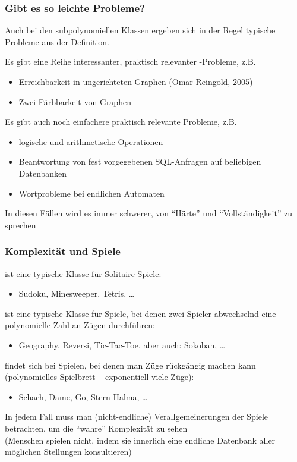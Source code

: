 \documentclass[onlymath]{beamer}
\begin{document}
\begin{frame}\frametitle{Gibt es so leichte Probleme?}

Auch bei den subpolynomiellen Klassen ergeben sich in der Regel typische Probleme
aus der Definition.
\bigskip\pause

Es gibt eine Reihe \alert{interessanter, praktisch relevanter \LogSpace-Probleme}, z.B.
\begin{itemize}
\item Erreichbarkeit in ungerichteten Graphen (Omar Reingold, 2005)
\item Zwei-Färbbarkeit von Graphen
\end{itemize}
\bigskip\pause

Es gibt auch \alert{noch einfachere praktisch relevante Probleme}, z.B.
\begin{itemize}
\item logische und arithmetische Operationen
\item Beantwortung von fest vorgegebenen SQL-Anfragen auf beliebigen Datenbanken
\item Wortprobleme bei endlichen Automaten
\end{itemize}

In diesen Fällen wird es immer schwerer, von "`Härte"' und "`Vollständigkeit"' zu sprechen

\end{frame}

\begin{frame}\frametitle{Komplexität und Spiele}

\alert{\NP} ist eine typische Klasse für Solitaire-Spiele:
\begin{itemize}
\item Sudoku, Minesweeper, Tetris, \ldots
\end{itemize}
\bigskip\pause

\alert{\PSpace} ist eine typische Klasse für Spiele, bei denen zwei Spieler
abwechselnd eine polynomielle Zahl an Zügen durchführen:
\begin{itemize}
\item Geography, Reversi, Tic-Tac-Toe, aber auch: Sokoban, \ldots
\end{itemize}
\bigskip\pause

\alert{\ExpTime} findet sich bei Spielen, bei denen man Züge rückgängig machen kann (polynomielles Spielbrett -- exponentiell viele Züge):
\begin{itemize}
\item Schach, Dame, Go, Stern-Halma, \ldots
\end{itemize}
\smallskip

In jedem Fall muss man (nicht-endliche) Verallgemeinerungen der Spiele betrachten,
um die "`wahre"' Komplexität zu sehen\\ {\tiny(Menschen spielen nicht, indem sie
innerlich eine endliche Datenbank aller möglichen Stellungen konsultieren)}
\smallskip\pause



\end{frame}
\end{document}

